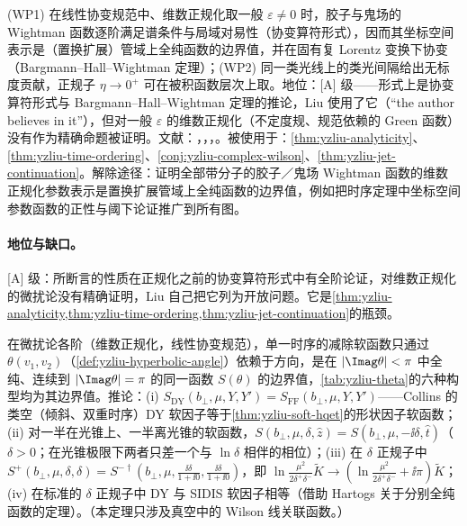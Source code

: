 \begin{assumption}\label{asm:yzliu-wightman-pt}
(WP1) 在线性协变规范中、维数正规化取一般 $\varepsilon\ne0$ 时，胶子与鬼场的 Wightman 函数逐阶满足谱条件与局域对易性（协变算符形式\cite{KugoOjima1979}），因而其坐标空间表示是（置换扩展）管域上全纯函数的边界值，并在固有复 Lorentz 变换下协变（Bargmann--Hall--Wightman 定理\cite[定理~2-11]{Streater:1989vi}）；(WP2) 同一类光线上的类光间隔给出无标度贡献，正规子 $\eta\to0^+$ 可在被积函数层次上取。地位：[A] 级——形式上是协变算符形式与 Bargmann--Hall--Wightman 定理的推论，Liu 使用了它（“the author believes in it”\cite[第~4~节]{Liu:2023pjb}），但对一般 $\varepsilon$ 的维数正规化（不定度规、规范依赖的 Green 函数）没有作为精确命题被证明。文献：\cite[附录~F]{Liu:2022nnk}，\cite[第~2~节、附录~B]{Liu:2023pjb}，\cite[附录~C.2]{Ji:2023pba}，\cite{KugoOjima1979,Streater:1989vi}。被使用于：\cref{thm:yzliu-analyticity}、\cref{thm:yzliu-time-ordering}、\cref{conj:yzliu-complex-wilson}、\cref{thm:yzliu-jet-continuation}。解除途径：证明全部带分子的胶子／鬼场 Wightman 函数的维数正规化参数表示是置换扩展管域上全纯函数的边界值，例如把时序定理中坐标空间参数函数的正性与阈下论证推广到所有图。
\end{assumption}

\paragraph{地位与缺口。}[A] 级：所断言的性质在正规化之前的协变算符形式中有全阶论证，对维数正规化的微扰论没有精确证明，Liu 自己把它列为开放问题。它是\cref{thm:yzliu-analyticity,thm:yzliu-time-ordering,thm:yzliu-jet-continuation}的瓶颈。

\begin{theorem}\label{thm:yzliu-analyticity}
在微扰论各阶（维数正规化，线性协变规范），单一时序的减除软函数只通过 $\theta(v_1,v_2)$（\cref{def:yzliu-hyperbolic-angle}）依赖于方向，是在 $|\Imag\theta|<\pi$ 中全纯、连续到 $|\Imag\theta|=\pi$ 的同一函数 $S(\theta)$ 的边界值，\cref{tab:yzliu-theta}的六种构型均为其边界值。推论：(i) $S_{\mathrm{DY}}(b_\perp,\mu,Y,Y')=S_{\mathrm{FF}}(b_\perp,\mu,Y,Y')$——Collins 的类空（倾斜、双重时序）DY 软因子等于\cref{thm:yzliu-soft-hqet}的形状因子软函数；(ii) 对一半在光锥上、一半离光锥的软函数，$S(b_\perp,\mu,\delta,\hat z)=S(b_\perp,\mu,-\ii\delta,\hat t)$（$\delta>0$；在光锥极限下两者只差一个与 $\ln\delta$ 相伴的相位）；(iii) 在 $\delta$ 正规子中 $S^+(b_\perp,\mu,\delta,\delta)=S^{-\dagger}(b_\perp,\mu,\frac{\ii\delta}{1+\ii0},\frac{\ii\delta}{1+\ii0})$，即 $\ln\frac{\mu^2}{2\delta^+\delta^-}\tilde K\to(\ln\frac{\mu^2}{2\delta^+\delta^-}+\ii\pi)\tilde K$；(iv) 在标准的 $\delta$ 正规子中 DY 与 SIDIS 软因子相等（借助 Hartogs 关于分别全纯函数的定理）。（本定理只涉及真空中的 Wilson 线关联函数。）%
\end{theorem}

